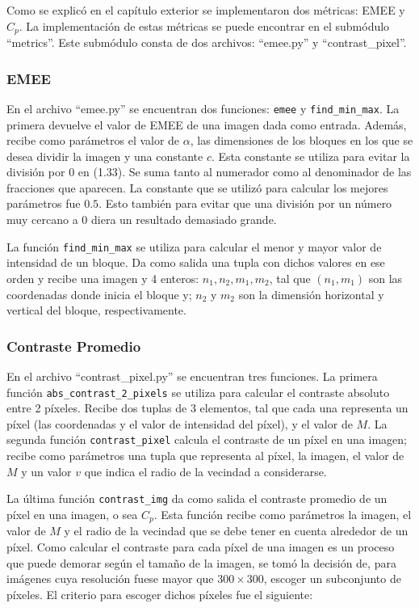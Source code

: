 Como se explic\'o en el cap\'itulo exterior se implementaron dos m\'etricas: EMEE y $C_p$. La implementaci\'on de estas m\'etricas se puede encontrar en el subm\'odulo ``metrics''. Este subm\'odulo consta de dos archivos: ``emee.py'' y ``contrast\_pixel''. 

\subsubsection{EMEE}
En el archivo ``emee.py'' se encuentran dos funciones: \verb|emee| y \verb|find_min_max|. La primera devuelve el valor de EMEE de una imagen dada como entrada. Adem\'as, recibe como par\'ametros el valor de $\alpha$, las dimensiones de los bloques en los que se desea dividir la imagen y una constante $c$. Esta constante se utiliza para evitar la divisi\'on por $0$ en (1.33). Se suma tanto al numerador como al denominador de las fracciones que aparecen. La constante que se utiliz\'o para calcular los mejores par\'ametros fue $0.5$. Esto tambi\'en para evitar que una divisi\'on por un n\'umero muy cercano a 0 diera un resultado demasiado grande. 

La funci\'on \verb|find_min_max| se utiliza para calcular el menor y mayor valor de intensidad de un bloque. Da como salida una tupla con dichos valores en ese orden y recibe una imagen y 4 enteros: $n_1,n_2,m_1,m_2$, tal que $(n_1,m_1)$ son las coordenadas donde inicia el bloque y; $n_2$ y $m_2$ son la dimensi\'on horizontal y vertical del bloque, respectivamente.

\subsubsection{Contraste Promedio}
En el archivo ``contrast\_pixel.py'' se encuentran tres funciones. La primera funci\'on \verb|abs_contrast_2_pixels| se utiliza para calcular el contraste absoluto entre 2 p\'ixeles. Recibe dos tuplas de 3 elementos, tal que cada una representa un p\'ixel (las coordenadas y el valor de intensidad del p\'ixel), y el valor de $M$. La segunda funci\'on \verb|contrast_pixel| calcula el contraste de un p\'ixel en una imagen; recibe como par\'ametros una tupla que representa al p\'ixel, la imagen, el valor de $M$ y un valor $v$ que indica el radio de la vecindad a considerarse. 

La \'ultima funci\'on \verb|contrast_img| da como salida el contraste promedio de un p\'ixel en una imagen, o sea $C_p$. Esta funci\'on recibe como par\'ametros la imagen, el valor de $M$ y el radio de la vecindad que se debe tener en cuenta alrededor de un p\'ixel. Como calcular el contraste para cada p\'ixel de una imagen es un proceso que puede demorar seg\'un el tama\~no de la imagen, se tom\'o la decisi\'on de, para im\'agenes cuya resoluci\'on fuese mayor que $300\times300$, escoger un subconjunto de p\'ixeles. El criterio para escoger dichos p\'ixeles fue el siguiente:

